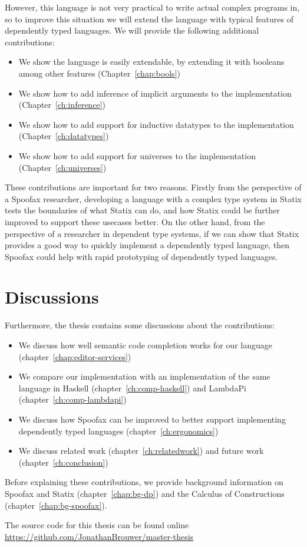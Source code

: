 However, this language is not very practical to write actual complex programs in, so to improve this situation we will extend the language with typical features of dependently typed languages. We will provide the following additional contributions:
\begin{itemize}
	\item We show the language is easily extendable, by extending it with booleans among other features (Chapter~\ref{chap:bools})
	\item We show how to add inference of implicit arguments to the implementation (Chapter~\ref{ch:inference})
	\item We show how to add support for inductive datatypes to the implementation (Chapter~\ref{ch:datatypes})
	\item We show how to add support for universes to the implementation (Chapter~\ref{ch:universes})
\end{itemize}

These contributions are important for two reasons. Firstly from the perspective of a Spoofax researcher, developing a language with a complex type system in Statix tests the boundaries of what Statix can do, and how Statix could be further improved to support these usecases better. On the other hand, from the perspective of a researcher in dependent type systems, if we can show that Statix provides a good way to quickly implement a dependently typed language, then Spoofax could help with rapid prototyping of dependently typed languages.

\section*{Discussions}

Furthermore, the thesis contains some discussions about the contributions:
\begin{itemize}
	\item We discuss how well semantic code completion works for our language (chapter~\ref{chap:editor-services})
	\item We compare our implementation with an implementation of the same language in Haskell (chapter~\ref{ch:comp-haskell}) and LambdaPi (chapter~\ref{ch:comp-lambdapi})
	\item We discuss how Spoofax can be improved to better support implementing dependently typed languages (chapter~\ref{ch:ergonomics})
	\item We discuss related work (chapter~\ref{ch:relatedwork}) and future work (chapter~\ref{ch:conclusion})
\end{itemize}

\noindent Before explaining these contributions, we provide background information on Spoofax and Statix (chapter~\ref{chap:bg-dp}) and the Calculus of Constructions (chapter~\ref{chap:bg-spoofax}).

The source code for this thesis can be found online \\ \url{https://github.com/JonathanBrouwer/master-thesis}

